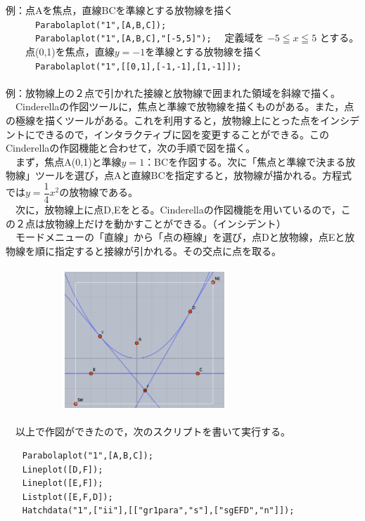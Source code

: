 \documentclass[papersize,a4paper,12pt,uplatex]{jsarticle}
\begin{document}
\begin{description}
例：点Aを焦点，直線BCを準線とする放物線を描く\\
　　　\verb|Parabolaplot("1",[A,B,C]); |\\
　　　\verb|Parabolaplot("1",[A,B,C],"[-5,5]");| 　定義域を $-5 \leqq x \leqq 5$ とする。\\
　　点(0,1)を焦点，直線$y=-1$を準線とする放物線を描く\\
　　　\verb|Parabolaplot("1",[[0,1],[-1,-1],[1,-1]]);|\\
　\\
例：放物線上の２点で引かれた接線と放物線で囲まれた領域を斜線で描く。\\
　Cinderellaの作図ツールに，焦点と準線で放物線を描くものがある。また，点の極線を描くツールがある。これを利用すると，放物線上にとった点をインシデントにできるので，インタラクティブに図を変更することができる。このCinderellaの作図機能と合わせて，次の手順で図を描く。\\
　まず，焦点A(0,1)と準線$y=1$：BCを作図する。次に「焦点と準線で決まる放物線」ツールを選び，点Aと直線BCを指定すると，放物線が描かれる。方程式では$y=\dfrac{1}{4}x^2$の放物線である。\\
　次に，放物線上に点D,Eをとる。Cinderellaの作図機能を用いているので，この２点は放物線上だけを動かすことができる。（インシデント）\\
　モードメニューの「直線」から「点の極線」を選び，点Dと放物線，点Eと放物線を順に指定すると接線が引かれる。その交点に点を取る。\\
　\\
　　　　　　\includegraphics[bb=0 0 964 826 , width=6cm]{Fig/parabolaplot.png}\\
　\\
　以上で作図ができたので，次のスクリプトを書いて実行する。
\begin{verbatim}
　　Parabolaplot("1",[A,B,C]); 
　　Lineplot([D,F]);
　　Lineplot([E,F]);
　　Listplot([E,F,D]);
　　Hatchdata("1",["ii"],[["gr1para","s"],["sgEFD","n"]]);
\end{verbatim}
　\\

\end{description}
\end{document}

